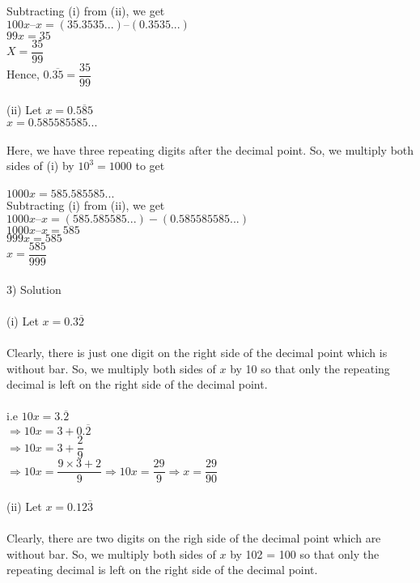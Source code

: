 \documentclass[a4paper,10pt]{article}
\begin{document}
{{{Subtracting (i) from (ii), we get\\
$100x –x = (35.3535...) – (0.3535...)$\\
$99x = 35$\\
$X = \dfrac{35}{99}$\\
Hence, $0.\overline{35} = \dfrac{35}{99}$\\\\
(ii) Let $x = 0.\overline{585}$\\
$x = 0.585585585...$\\\\
Here, we have three repeating digits after the decimal point. So, we
multiply both sides of (i) by $10^3 =  1000$ to get\\\\
$1000 x = 585.585585...$\\
Subtracting (i) from (ii), we get\\
$1000 x –x = (585.585585...)- (0.585585585...)$\\
$1000 x – x = 585$\\
$999x = 585$\\
$ x = \dfrac{585}{999}$\\\\
3) Solution\\\\
(i) Let $x = 0.3\overline{2}$ \\\\
Clearly, there is just one digit on the right side of the decimal point
which is without bar. So,
we multiply both sides of $x$ by 10 so that only the repeating decimal is
left on the right side of
the decimal point.\\\\
 i.e $10 x = 3.\overline{2}$\\
$\Rightarrow 10x = 3+0.\overline{2}$\\
$\Rightarrow 10x = 3+\dfrac{2}{9}$\\
$\Rightarrow 10x = \dfrac{9\times3+2}{9} \Rightarrow 10x = \dfrac{29}{9}
\Rightarrow x = \dfrac{29}{90}$\\\\
(ii) Let $x = 0.12\overline{3}$\\\\
Clearly, there are two digits on the righ side of the decimal point
which are without bar. So,
we multiply both sides of $x$ by 102 = 100 so that only the repeating
decimal is left on the right
side of the decimal point.\\\\
}}}
\end{document}
